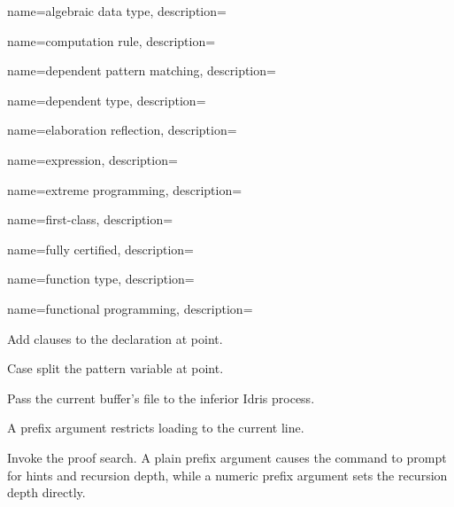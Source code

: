 {
  name={algebraic data type},
  description={}
}

{
  name={computation rule},
  description={}
}

{
  name={dependent pattern matching},
  description={}
}


{
  name={dependent type},
  description={}
}

{
  name={elaboration reflection},
  description={}
}

{
  name={expression},
  description={}
}

{
  name={extreme programming},
  description={}
}

{
  name={first-class},
  description={}
}

{
  name={fully certified},
  description={}
}

{
  name={function type},
  description={}
}

{
  name={functional programming},
  description={}
}


{

  Add clauses to the declaration at point.
}

{

  Case split the pattern variable at point.
}

{

  Pass the current buffer’s file to the inferior Idris process.

  A prefix argument restricts loading to the current line.
}

{

  Invoke the proof search. A plain prefix argument causes the
  command to prompt for hints and recursion depth, while a numeric
  prefix argument sets the recursion depth directly.
}

